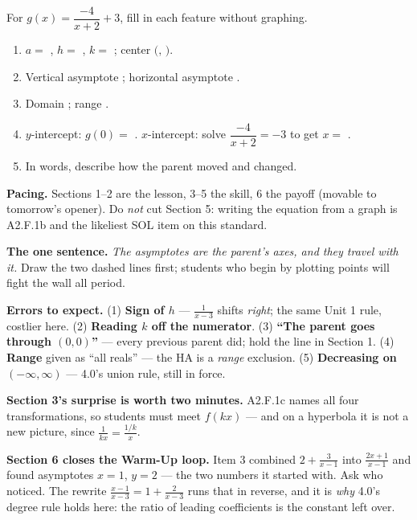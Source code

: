 \documentclass[10pt]{article}
\begin{document}
\begin{practicebox}
For $g(x)=\dfrac{-4}{x+2}+3$, fill in each feature without graphing.
\begin{enumerate}[leftmargin=1.7em, itemsep=6pt]
  \item $a=$ , \; $h=$ , \; $k=$ ; \quad center
        $($$,\,$$)$.
  \item Vertical asymptote ; \quad horizontal asymptote .
  \item Domain ; \quad range .
  \item $y$-intercept: $g(0)=$ . \quad $x$-intercept: solve $\dfrac{-4}{x+2}=-3$ to get
        $x=$ .
  \item In words, describe how the parent moved and changed. 
\end{enumerate}
\end{practicebox}

\begin{teachernote}
\textbf{Pacing.} Sections 1--2 are the lesson, 3--5 the skill, 6 the payoff (movable to tomorrow's
opener). Do \emph{not} cut Section 5: writing the equation from a graph is A2.F.1b and the likeliest
SOL item on this standard.

\vspace{3pt}
\textbf{The one sentence.} \emph{The asymptotes are the parent's axes, and they travel with it.} Draw
the two dashed lines first; students who begin by plotting points will fight the wall all period.

\vspace{3pt}
\textbf{Errors to expect.} (1) \textbf{Sign of $h$} --- $\frac{1}{x-3}$ shifts \emph{right}; the same
Unit 1 rule, costlier here. (2) \textbf{Reading $k$ off the numerator}. (3) \textbf{``The parent goes
through $(0,0)$''} --- every previous parent did; hold the line in Section 1. (4) \textbf{Range} given
as ``all reals'' --- the HA is a \emph{range} exclusion. (5) \textbf{Decreasing on $(-\infty,\infty)$}
--- 4.0's union rule, still in force.

\vspace{3pt}
\textbf{Section 3's surprise is worth two minutes.} A2.F.1c names all four transformations, so students
must meet $f(kx)$ --- and on a hyperbola it is not a new picture, since $\frac{1}{kx}=\frac{1/k}{x}$.

\vspace{3pt}
\textbf{Section 6 closes the Warm-Up loop.} Item 3 combined $2+\frac{3}{x-1}$ into $\frac{2x+1}{x-1}$
and found asymptotes $x=1$, $y=2$ --- the two numbers it started with. Ask who noticed. The rewrite
$\frac{x-1}{x-3}=1+\frac{2}{x-3}$ runs that in reverse, and it is \emph{why} 4.0's degree rule holds
here: the ratio of leading coefficients is the constant left over.
\end{teachernote}
\end{document}
